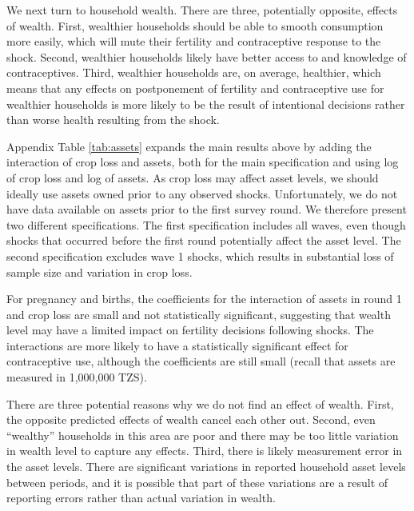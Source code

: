 \documentclass[letterpaper,12pt]{article}
\begin{document}



We next turn to household wealth.
There are three, potentially opposite, effects of wealth.
First,
wealthier households should be able to smooth consumption more easily,
which will mute their fertility and contraceptive response to the shock.
Second, 
wealthier households likely have better access to and knowledge
of contraceptives.
Third, 
wealthier households are, on average, healthier, which means that any 
effects on postponement of fertility and contraceptive use for wealthier
households is more likely to be the result of intentional decisions 
rather than worse health resulting from the shock.

Appendix Table \ref{tab:assets} expands the main results above by adding 
the interaction of crop loss and assets, both for the main specification
and using log of crop loss and log of assets.
As crop loss may affect asset levels, we should ideally use assets owned 
prior to any observed shocks.
Unfortunately, we do not have data available on assets prior to the first 
survey round.
We therefore present two different specifications.
The first specification includes all waves, even though shocks that 
occurred before the first round potentially affect the asset level.
The second specification excludes wave 1 shocks, which results in
substantial loss of sample size and variation in crop loss.

For pregnancy and births, the coefficients for the interaction of assets 
in round 1 and crop loss are small and not statistically significant,
suggesting that wealth level may have a limited impact on fertility
decisions following shocks. 
The interactions are more likely to have a statistically significant
effect for contraceptive use, although the coefficients are still
small (recall that assets are measured in 1,000,000 TZS).

There are three potential reasons why we do not find an effect of wealth.
First, the opposite predicted effects of wealth cancel each other out.
Second, even ``wealthy'' households in this area are  poor and
there may be too little variation in wealth level to capture any effects.
Third, there is likely measurement error in the asset levels. 
There are significant variations in reported household asset levels between 
periods, and it is possible that part of these variations are a result of 
reporting errors rather than actual variation in wealth.


\end{document}
